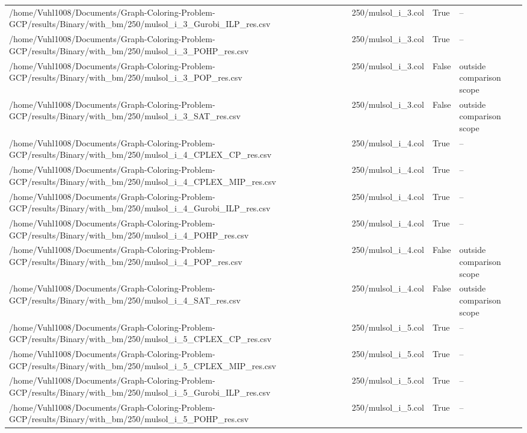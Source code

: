 \begin{table}[htbp]
\begin{tabular}{llll}
/home/Vuhl1008/Documents/Graph-Coloring-Problem-GCP/results/Binary/with\_bm/250/mulsol\_i\_3\_Gurobi\_ILP\_res.csv & 250/mulsol\_i\_3.col & True & -- \\
/home/Vuhl1008/Documents/Graph-Coloring-Problem-GCP/results/Binary/with\_bm/250/mulsol\_i\_3\_POHP\_res.csv & 250/mulsol\_i\_3.col & True & -- \\
/home/Vuhl1008/Documents/Graph-Coloring-Problem-GCP/results/Binary/with\_bm/250/mulsol\_i\_3\_POP\_res.csv & 250/mulsol\_i\_3.col & False & outside comparison scope \\
/home/Vuhl1008/Documents/Graph-Coloring-Problem-GCP/results/Binary/with\_bm/250/mulsol\_i\_3\_SAT\_res.csv & 250/mulsol\_i\_3.col & False & outside comparison scope \\
/home/Vuhl1008/Documents/Graph-Coloring-Problem-GCP/results/Binary/with\_bm/250/mulsol\_i\_4\_CPLEX\_CP\_res.csv & 250/mulsol\_i\_4.col & True & -- \\
/home/Vuhl1008/Documents/Graph-Coloring-Problem-GCP/results/Binary/with\_bm/250/mulsol\_i\_4\_CPLEX\_MIP\_res.csv & 250/mulsol\_i\_4.col & True & -- \\
/home/Vuhl1008/Documents/Graph-Coloring-Problem-GCP/results/Binary/with\_bm/250/mulsol\_i\_4\_Gurobi\_ILP\_res.csv & 250/mulsol\_i\_4.col & True & -- \\
/home/Vuhl1008/Documents/Graph-Coloring-Problem-GCP/results/Binary/with\_bm/250/mulsol\_i\_4\_POHP\_res.csv & 250/mulsol\_i\_4.col & True & -- \\
/home/Vuhl1008/Documents/Graph-Coloring-Problem-GCP/results/Binary/with\_bm/250/mulsol\_i\_4\_POP\_res.csv & 250/mulsol\_i\_4.col & False & outside comparison scope \\
/home/Vuhl1008/Documents/Graph-Coloring-Problem-GCP/results/Binary/with\_bm/250/mulsol\_i\_4\_SAT\_res.csv & 250/mulsol\_i\_4.col & False & outside comparison scope \\
/home/Vuhl1008/Documents/Graph-Coloring-Problem-GCP/results/Binary/with\_bm/250/mulsol\_i\_5\_CPLEX\_CP\_res.csv & 250/mulsol\_i\_5.col & True & -- \\
/home/Vuhl1008/Documents/Graph-Coloring-Problem-GCP/results/Binary/with\_bm/250/mulsol\_i\_5\_CPLEX\_MIP\_res.csv & 250/mulsol\_i\_5.col & True & -- \\
/home/Vuhl1008/Documents/Graph-Coloring-Problem-GCP/results/Binary/with\_bm/250/mulsol\_i\_5\_Gurobi\_ILP\_res.csv & 250/mulsol\_i\_5.col & True & -- \\
/home/Vuhl1008/Documents/Graph-Coloring-Problem-GCP/results/Binary/with\_bm/250/mulsol\_i\_5\_POHP\_res.csv & 250/mulsol\_i\_5.col & True & -- \\

\end{tabular}
\end{table}
